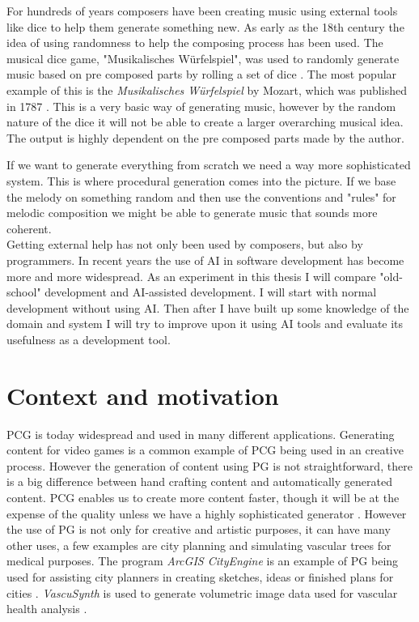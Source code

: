 For hundreds of years composers have been creating music using external tools like dice to help them generate something new.
As early as the 18th century the idea of using randomness to help the composing process has been used.
The musical dice game, "Musikalisches Würfelspiel", was used to randomly generate music based on pre composed parts by rolling a set of dice \cite{MusikalischesWurfelspiel2025}.
The most popular example of this is the \textit{Musikalisches Würfelspiel} by Mozart, which was published in 1787 \cite{MusikalischesWurfespielK516f}.
This is a very basic way of generating music, however by the random nature of the dice it will not be able to create a larger overarching musical idea. The output is highly dependent on the pre composed parts made by the author.

If we want to generate everything from scratch we need a way more sophisticated system. 
This is where procedural generation comes into the picture.
If we base the melody on something random and then use the conventions and "rules" for melodic composition we might be able to generate music that sounds more coherent.
\\

Getting external help has not only been used by composers, but also by programmers. In recent years the use of \ac{AI} in software development has become more and more widespread. As an experiment in this thesis I will compare "old-school" development and \ac{AI}-assisted development. I will start with normal development without using \ac{AI}. Then after I have built up some knowledge of the domain and system I will try to improve upon it using \ac{AI} tools and evaluate its usefulness as a development tool.
\\

\section{Context and motivation}
\ac{PCG} is today widespread and used in many different applications. Generating content for video games is a common example of \ac{PCG} being used in an creative process. However the generation of content using \ac{PG} is not straightforward, there is a big difference between hand crafting content and automatically generated content. \ac{PCG} enables us to create more content faster, though it will be at the expense of the quality unless we have a highly sophisticated generator \cite{freiknechtSurveyProceduralGeneration2017}. However the use of \ac{PG} is not only for creative and artistic purposes, it can have many other uses, a few examples are city planning and simulating vascular trees for medical purposes.
The program \textit{ArcGIS CityEngine} is an example of \ac{PG} being used for assisting city planners in creating sketches, ideas or finished plans for cities \cite{ProceduralCityGenerator}. \textit{VascuSynth} is used to generate volumetric image data used for vascular health analysis \cite{hamarnehVascuSynthSimulatingVascular2010}. \\

